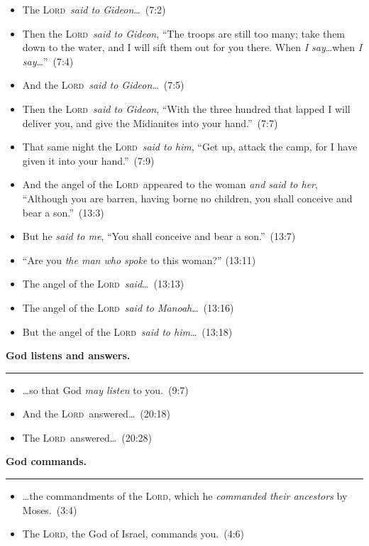 \documentclass{article}
\newcommand{\godcategory}[1]{\bigskip\noindent \textbf{#1}\smallskip\hrule\nopagebreak}
\newcommand{\Lord}{\textsc{Lord}}
\newcommand{\elips}{\thinspace\ldots}
\begin{document}
\begin{landscape}
\begin{multicols}{3}
\begin{itemize}
  \item The \Lord\ \emph{said to Gideon}\elips~(7:2)
  \item Then the \Lord\ \emph{said to Gideon}, “The troops are still too many; take them down to the water, and I will sift them out for you there. When \emph{I say}\elips when \emph{I say}\elips''~(7:4)
  \item And the \Lord\ \emph{said to Gideon}\elips~(7:5)
  \item Then the \Lord\ \emph{said to Gideon}, “With the three hundred that lapped I will deliver you, and give the Midianites into your hand.''~(7:7)
  \item That same night the \Lord\ \emph{said to him}, “Get up, attack the camp, for I have given it into your hand.”~(7:9)
  \item And the angel of the \Lord\ appeared to the woman \emph{and said to her}, “Although you are barren, having borne no children, you shall conceive and bear a son.”~(13:3)
  \item But he \emph{said to me}, “You shall conceive and bear a son.”~(13:7)
  \item “Are you \emph{the man who spoke} to this woman?” (13:11)
  \item The angel of the \Lord\ \emph{said}\elips~(13:13)
  \item The angel of the \Lord\ \emph{said to Manoah}\elips~(13:16)
  \item But the angel of the \Lord\ \emph{said to him}\elips~(13:18)
\end{itemize}

\godcategory{God listens and answers.}
\begin{itemize}
  \item \ldots so that God \emph{may listen} to you.~(9:7)
  \item And the \Lord\ answered\elips~(20:18)
  \item The \Lord\ answered\elips~(20:28)
\end{itemize}

\godcategory{God commands.}
\begin{itemize}
  \item \ldots the commandments of the \Lord, which he \emph{commanded their ancestors} by Moses.~(3:4)
  \item The \Lord, the God of Israel, commands you.~(4:6)
\end{itemize}


\end{multicols}
\end{landscape}
\end{document}
